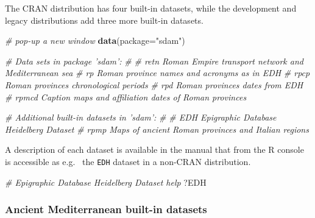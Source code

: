 \documentclass[a4paper,11pt]{memoir}
\newenvironment{Shaded}{\begin{snugshade}}{\end{snugshade}}
\newcommand{\CommentTok}[1]{\textcolor[rgb]{0.56,0.35,0.01}{\textit{#1}}}
\newcommand{\DataTypeTok}[1]{\textcolor[rgb]{0.13,0.29,0.53}{#1}}
\newcommand{\KeywordTok}[1]{\textcolor[rgb]{0.13,0.29,0.53}{\textbf{#1}}}
\newcommand{\NormalTok}[1]{#1}
\newcommand{\StringTok}[1]{\textcolor[rgb]{0.31,0.60,0.02}{#1}}
\begin{document}
The CRAN distribution has four built-in datasets, while the development
and legacy distributions add three more built-in datasets.

\begin{Shaded}
\begin{Highlighting}[]
\CommentTok{# pop-up a new window}
\KeywordTok{data}\NormalTok{(}\DataTypeTok{package=}\StringTok{"sdam"}\NormalTok{)}
\end{Highlighting}
\end{Shaded}

\begin{Shaded}
\begin{Highlighting}[]
\CommentTok{# Data sets in package 'sdam':}
\CommentTok{# }
\CommentTok{# retn      Roman Empire transport network and Mediterranean sea}
\CommentTok{# rp        Roman province names and acronyms as in EDH}
\CommentTok{# rpcp      Roman provinces chronological periods}
\CommentTok{# rpd       Roman provinces dates from EDH}
\CommentTok{# rpmcd     Caption maps and affiliation dates of Roman provinces}
\end{Highlighting}
\end{Shaded}

\begin{Shaded}
\begin{Highlighting}[]
\CommentTok{# Additional built-in datasets in 'sdam':}
\CommentTok{#}
\CommentTok{# EDH       Epigraphic Database Heidelberg Dataset}
\CommentTok{# rpmp      Maps of ancient Roman provinces and Italian regions}
\end{Highlighting}
\end{Shaded}

A description of each dataset is available in the manual that from the R
console is accessible as e.g.~ the \texttt{EDH} dataset in a non-CRAN
distribution.

\begin{Shaded}
\begin{Highlighting}[]
\CommentTok{# Epigraphic Database Heidelberg Dataset help}
\NormalTok{?EDH}
\end{Highlighting}
\end{Shaded}

\hypertarget{ancient-mediterranean-built-in-datasets}{%
\subsubsection{Ancient Mediterranean built-in
datasets}\label{ancient-mediterranean-built-in-datasets}}
\end{document}
